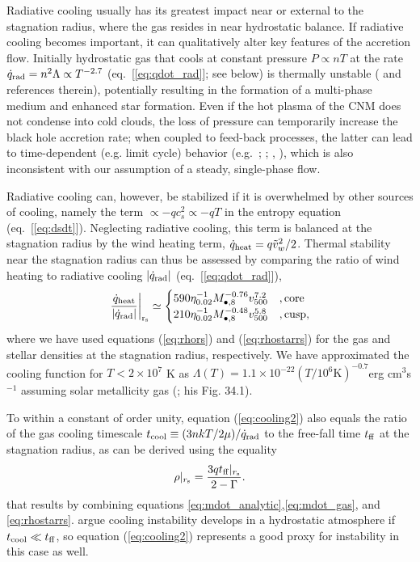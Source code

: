 \documentclass[usenatbib,fleqn]{mn2e}
\newcommand{\tff}{t_{\rm ff}}
\begin{document}
Radiative cooling usually has its greatest impact near or external to the stagnation radius, where the gas resides in near hydrostatic balance.  If radiative cooling becomes important, it can qualitatively alter key features of the accretion flow. Initially hydrostatic gas that cools at constant pressure $P \propto nT$ at the rate $\dot{q}_{\rm rad} = n^{2}\Lambda \propto T^{-2.7}$ (eq.~[\ref{eq:qdot_rad}]; see below) is thermally unstable (\citealt{McCourt+12} and references therein), potentially resulting in the formation of a multi-phase medium and enhanced star formation.  Even if the hot plasma of the CNM does not condense into cold clouds, the loss of pressure can temporarily increase the black hole accretion rate; when coupled to feed-back processes, the latter can lead to time-dependent (e.g. limit cycle) behavior (e.g.~\citealt{Ciotti&Ostriker07}; \citealt{Ciotti+10}; \citealt{Yuan&Li11}, \citealt{Gan+14}), which is also inconsistent with our assumption of a steady, single-phase flow.  

Radiative cooling can, however, be stabilized if it is overwhelmed by other sources of cooling, namely the term $\propto -q c_{s}^{2} \propto -qT$ in the entropy equation (eq.~[\ref{eq:dsdt}]).  Neglecting radiative cooling, this term is balanced at the stagnation radius by the wind heating term, $\dot{q}_{\rm heat} = q \tilde{v}_{w}^{2}/2$.  Thermal stability near the stagnation radius can thus be assessed by comparing the ratio of wind heating to radiative cooling $|\dot{q}_{\rm rad}|$ (eq.~[\ref{eq:qdot_rad}]),
\begin{align}
\left.\frac{\dot{q}_{\rm heat}}{|\dot{q}_{\rm rad}|}\right|_{\rm r_{\rm s}} \simeq
  \begin{cases}
   590 \eta_{0.02}^{-1} M_{\bullet,8}^{-0.76}v_{500}^{7.2}  &, \text{core}\\
   210 \eta_{0.02}^{-1} M_{\bullet,8}^{-0.48}v_{500}^{5.8}  &, \text{cusp},     
  \end{cases}
  \label{eq:cooling2}
\end{align}
where we have used equations (\ref{eq:rhors}) and (\ref{eq:rhostarrs}) for the gas and stellar densities at the stagnation radius, respectively.  We have approximated the cooling function for $T < 2\times 10^{7}$ K as $\Lambda(T) = 1.1 \times 10^{-22} \left(T/10^6 \text{K}\right)^{-0.7}  $erg cm$^3 $s$^{-1}$ assuming solar metallicity gas (\citealt{Draine:2011a}; his Fig. 34.1).  

To within a constant of order unity, equation (\ref{eq:cooling2}) also equals the ratio of the gas cooling timescale $t_{\rm cool} \equiv (3n kT/2\mu )/\dot{q}_{\rm rad}$ to the free-fall time $t_{\rm ff}$ at the stagnation radius, as can be derived using the equality 
\begin{align}
\rho|_{r_{\rm s}}=\frac{3 q\tff|_{r_{\rm s}}}{2-\Gamma}.
\label{eq:rhors2}
\end{align}
that results by combining equations
\eqref{eq:mdot_analytic},\eqref{eq:mdot_gas}, and
\eqref{eq:rhostarrs}.  \citet{McCourt+12} argue cooling instability
develops in a hydrostatic atmosphere if $t_{\rm cool} \ll t_{\rm ff}$,
so equation (\ref{eq:cooling2}) represents a good proxy for
instability in this case as well.
\end{document}
